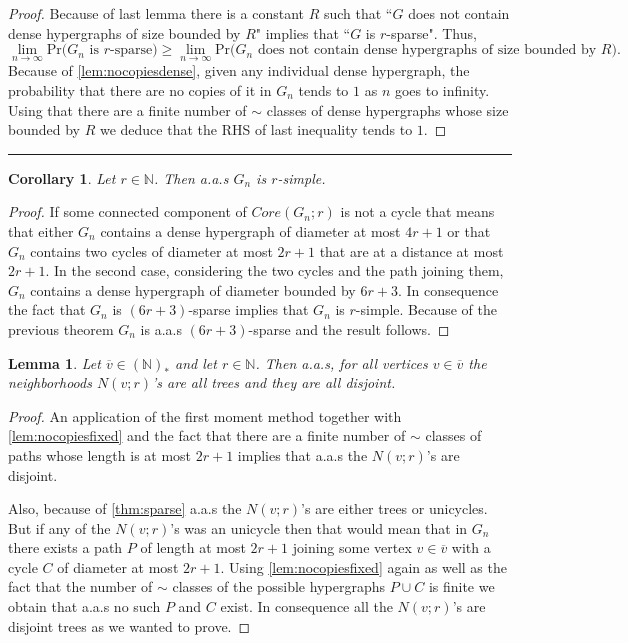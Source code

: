 \documentclass[12pt,notitlepage,a4paper]{article}
\newtheorem{lemma}{Lemma}[section]
\newtheorem{corollary}{Corollary}[section]
\theoremstyle{definition}
\newcommand{\N}{\mathbb{N}}
\newcommand{\Ln}{\lim\limits_{n\to \infty}}
\newcommand{\sep}{\noindent\rule{2cm}{0.4pt}}
\begin{document}
\begin{proof}
	Because of last lemma there is a constant $R$ such that 
	``$G$ does not contain dense hypergraphs of size bounded by $R$" implies
	that ``$G$ is $r$-sparse". Thus,
	\[ \Ln \mathrm{Pr}\big( G_n \text{ is } r \text{-sparse}  \big)
	\geq \Ln \mathrm{Pr} \big( G_n \text{ does not contain dense 
	hypergraphs of size bounded by } R\big).\] 
	Because of	\cref{lem:nocopiesdense}, given any individual dense hypergraph,
	the probability that there are no copies
	of it in $G_n$ tends to $1$ as $n$ goes to infinity. Using that
	there are a finite number of $\sim$ classes of dense hypergraphs whose
	size bounded by	$R$ we deduce that the RHS of last inequality tends to $1$. 
\end{proof}
\sep
\begin{corollary}\label{cor:simple}
	Let $r\in \N$. Then a.a.s $G_n$ is $r$-simple.
\end{corollary}
\begin{proof}
	If some connected component of $Core(G_n;r)$ is not a cycle that means
	that either $G_n$ contains a dense hypergraph of diameter at most $4r+1$
	or that $G_n$ contains two cycles of diameter at most $2r+1$ that are at
	a distance at most $2r+1$. In the second case, considering the two cycles
	and the path joining them, $G_n$ contains a dense hypergraph of diameter
	bounded by $6r+3$. In consequence the fact that $G_n$ is $(6r+3)$-sparse
	implies that $G_n$ is $r$-simple. Because of the previous theorem 
	$G_n$ is a.a.s $(6r+3)$-sparse and the result follows. 
\end{proof}
	
\begin{lemma} \label{lem:disjointtrees}
	Let $\overline{v}\in (\N)_*$ and let $r\in \N$. Then
	a.a.s, for all vertices $v\in \overline{v}$ the neighborhoods 
	$N(v;r)$'s are all trees and they are all disjoint. 
\end{lemma}
\begin{proof}
	An application of the first moment method together with
	\cref{lem:nocopiesfixed} and the fact that there are a finite number
	of $\sim$ classes of paths whose length is at most $2r+1$ implies that
	a.a.s the $N(v;r)$'s are disjoint. \par
	Also, because of \cref{thm:sparse} a.a.s the $N(v;r)$'s are either 
	trees or unicycles. But if any of the $N(v;r)$'s was an unicycle then
	that would mean that in $G_n$ there exists a path $P$ of length at most
	$2r+1$ joining some vertex $v\in \overline{v}$
	with a cycle $C$ of diameter at most $2r+1$. Using \cref{lem:nocopiesfixed}
	again as well as the fact that the number of $\sim$ classes of the possible hypergraphs
	$P\cup C$ is finite we obtain that a.a.s no such $P$ and $C$ exist. 
	In consequence all the $N(v;r)$'s are disjoint trees as we wanted to prove. \par
\end{proof}
\end{document}
